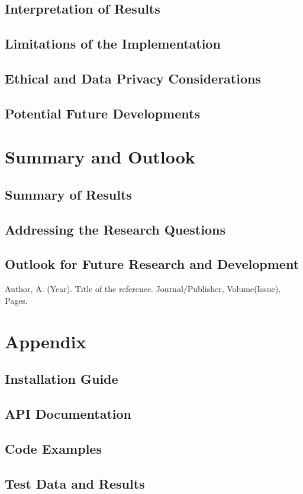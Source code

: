 \documentclass{article}
\begin{document}
\subsection{Interpretation of Results}
\subsection{Limitations of the Implementation}
\subsection{Ethical and Data Privacy Considerations}
\subsection{Potential Future Developments}

\newpage

\section{Summary and Outlook}

\subsection{Summary of Results}
\subsection{Addressing the Research Questions}
\subsection{Outlook for Future Research and Development}

\newpage

\begin{thebibliography}{99}
 Author, A. (Year). Title of the reference. Journal/Publisher, Volume(Issue), Pages.
\end{thebibliography}

\newpage

\appendix
\section*{Appendix}
\subsection*{Installation Guide}
\subsection*{API Documentation}
\subsection*{Code Examples}
\subsection*{Test Data and Results}
\end{document}
